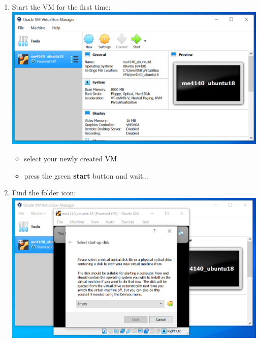 \documentclass[12pt]{article}
\begin{document}
\begin{description}
\begin{description}
\begin{enumerate}[label=\alph*)] 
\item Start the VM for the first time: \vspace{5mm} \\
      		\hspace*{-2.5cm}\includegraphics[scale=.6]{Capture9.png}\\
            \begin{itemize}
                    
                 \item select your newly created VM      
                 \item press the green {\bf start} button and wait...
     
            \end{itemize}
\vspace{10mm}
\item Find the folder icon: \vspace{5mm} \\
      		\hspace*{-2.5cm}\includegraphics[scale=.6]{Capture10.png}\\
            \begin{itemize}
                    

\end{itemize}
\end{enumerate}
\end{description}
\end{description}
\end{document}
